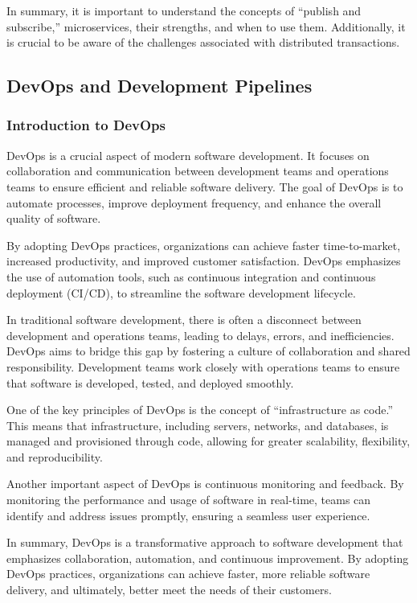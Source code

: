 In summary, it is important to understand the concepts of ``publish and
subscribe,'' microservices, their strengths, and when to use them.
Additionally, it is crucial to be aware of the challenges associated
with distributed transactions.

\subsection{DevOps and Development Pipelines}

\subsubsection{Introduction to DevOps}

DevOps is a crucial aspect of modern software development. It focuses on
collaboration and communication between development teams and operations
teams to ensure efficient and reliable software delivery. The goal of
DevOps is to automate processes, improve deployment frequency, and
enhance the overall quality of software.

By adopting DevOps practices, organizations can achieve faster
time-to-market, increased productivity, and improved customer
satisfaction. DevOps emphasizes the use of automation tools, such as
continuous integration and continuous deployment (CI/CD), to streamline
the software development lifecycle.

In traditional software development, there is often a disconnect between
development and operations teams, leading to delays, errors, and
inefficiencies. DevOps aims to bridge this gap by fostering a culture of
collaboration and shared responsibility. Development teams work closely
with operations teams to ensure that software is developed, tested, and
deployed smoothly.

One of the key principles of DevOps is the concept of ``infrastructure
as code.'' This means that infrastructure, including servers, networks,
and databases, is managed and provisioned through code, allowing for
greater scalability, flexibility, and reproducibility.

Another important aspect of DevOps is continuous monitoring and
feedback. By monitoring the performance and usage of software in
real-time, teams can identify and address issues promptly, ensuring a
seamless user experience.

In summary, DevOps is a transformative approach to software development
that emphasizes collaboration, automation, and continuous improvement.
By adopting DevOps practices, organizations can achieve faster, more
reliable software delivery, and ultimately, better meet the needs of
their customers.

